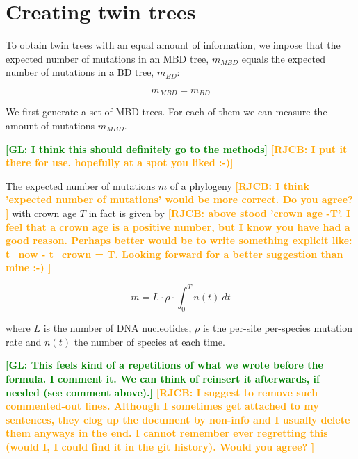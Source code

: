 \documentclass{article}
\newcommand*\richel[1]{\textcolor{orange}{\textbf{[RJCB: #1]}}}
\newcommand*\gio[1]{\textcolor{green}{\textbf{[GL: #1]}}}
\begin{document}
\appendix

\section{Creating twin trees}

To obtain twin trees with an equal amount of information, we impose
that the expected number of mutations in an MBD tree, $m_{MBD}$ equals
the expected number of mutations in a BD tree, $m_{BD}$:

\begin{equation}
m_{MBD} = m_{BD} \label{m equivalence}
\end{equation} 

We first generate a set of MBD trees. For each of them we can measure the amount of mutations $m_{MBD}$.

\gio{I think this should definitely go to the methods}
\richel{I put it there for use, hopefully at a spot you liked :-)}

The expected number of mutations $m$ of a phylogeny 
\richel{
  I think 'expected number of mutations' would be more correct.
  Do you agree?
}
with crown age $T$ in fact is given by
\richel{
  above stood 'crown age -T'. 
  I feel that a crown age is a positive number,
  but I know you have had a good reason.
  Perhaps better would be to write something explicit like:
  t_now - t_crown = T.
  Looking forward for a better suggestion than mine :-)
}

\begin{equation}
m = L \cdot \rho \cdot \int_{0}^{T} n(t)\ dt \label{m calculation}
\end{equation}

where $L$ is the number of DNA nucleotides, 
$\rho$ is the per-site per-species mutation rate and
$n(t)$ the number of species at each time.

\gio{This feels kind of a repetitions of what we wrote before the formula. I comment it. We can think of reinsert it afterwards, if needed (see comment above).}
\richel{
  I suggest to remove such commented-out lines. 
  Although I sometimes get attached to my sentences,
  they clog up the document by non-info and 
  I usually delete them anyways in the end.
  I cannot remember ever regretting this (would I, 
  I could find it in the git history).
  Would you agree?
}
\end{document}
